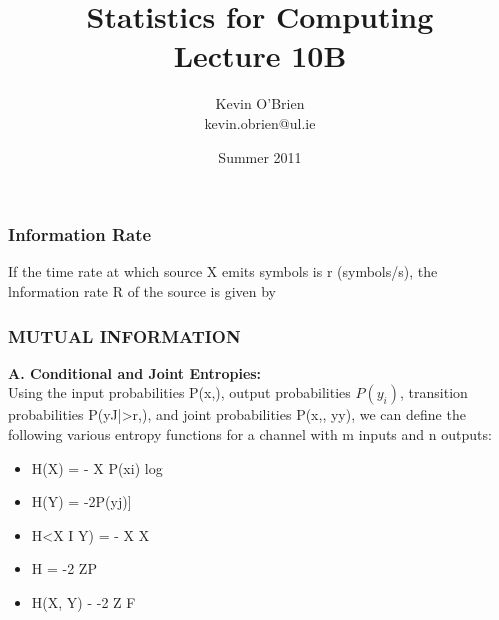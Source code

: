 \documentclass[a4]{beamer}
\title[MA4413t]{Statistics for Computing \\ {\normalsize Lecture 10B}}
\author[Kevin O'Brien]{Kevin O'Brien \\ {\scriptsize kevin.obrien@ul.ie}}
\date{Summer 2011}
\institute[Maths \& Stats]{Dept. of Mathematics \& Statistics, \\ University \textit{of} Limerick}
\begin{document}



\begin{frame}
\frametitle{Information Rate}
If the time rate at which source X emits symbols is r (symbols/s), the lnformation rate R of the
source is given by


\end{frame}


\begin{frame}
\frametitle{ MUTUAL INFORMATION}
\textbf{A. Conditional and Joint Entropies:}\\
Using the input probabilities P(x,), output probabilities $P(y_i)$, transition probabilities P(yJ|>r,),
and joint probabilities P(x,, yy), we can define the following various entropy functions for a channel
with m inputs and n outputs:
 
\begin{itemize}
\item H(X) = - X P(xi) log %
\item H(Y) = -2P(yj)]%
\item H<X I Y) = - X X %
\item H = -2 ZP%
\item H(X, Y) - -2 Z F%
\end{itemize}
\end{frame}
\end{document}
